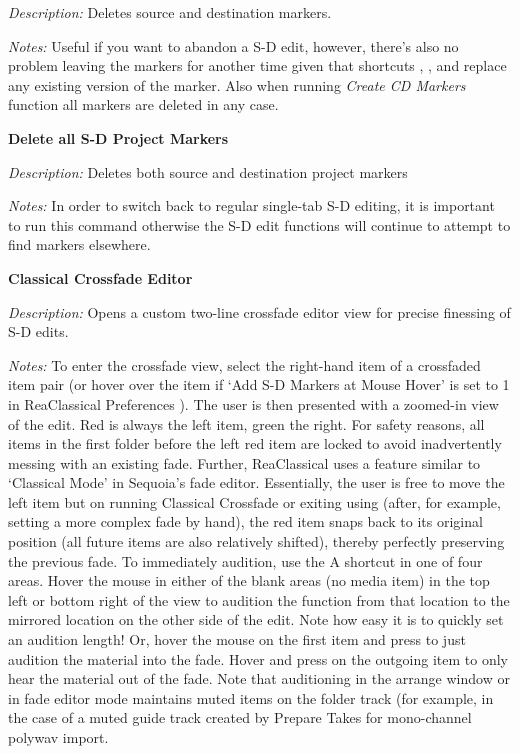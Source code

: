 \documentclass[10pt,american]{article}
\begin{document}
\emph{Description: }Deletes source and destination markers.

\emph{Notes: }Useful if you want to abandon a S-D edit, however, there's also no
problem leaving the markers for another time given that shortcuts 
, , and  replace any existing version of the marker.
Also when running \emph{Create CD Markers} function all markers are deleted in
any case.

\textbf{Delete all S-D Project Markers }\keys{\shift+\del}

\emph{Description:} Deletes both source and destination project markers

\emph{Notes: }In order to switch back to regular single-tab S-D editing, it is
important to run this command otherwise the S-D edit functions will continue to
attempt to find markers elsewhere.

\textbf{Classical Crossfade Editor }

\emph{Description: }Opens a custom two-line crossfade editor view for precise
finessing of S-D edits.

\emph{Notes: }To enter the crossfade view, select the right-hand item of a
crossfaded item pair (or hover over the item if `Add S-D Markers at Mouse Hover'
is set to 1 in ReaClassical Preferences ). The user is then presented
with a zoomed-in view of the edit. Red is always the left item, green the right.
For safety reasons, all items in the first folder before the left red item are
locked to avoid inadvertently messing with an existing fade. Further,
ReaClassical uses a feature similar to `Classical Mode' in Sequoia's fade
editor. Essentially, the user is free to move the left item but on running
Classical Crossfade  or exiting using  (after, for example,
setting a more complex fade by hand), the red item snaps back to its original
position (all future items are also relatively shifted), thereby perfectly
preserving the previous fade. To immediately audition, use the A shortcut in one
of four areas. Hover the mouse in either of the blank areas (no media item) in
the top left or bottom right of the view to audition the function from that
location to the mirrored location on the other side of the edit. Note how easy
it is to quickly set an audition length! Or, hover the mouse on the first item
and press  to just audition the material into the fade. Hover and press
 on the outgoing item to only hear the material out of the fade. Note
that auditioning in the arrange window or in fade editor mode maintains muted
items on the folder track (for example, in the case of a muted guide track
created by Prepare Takes  for mono-channel polywav import.
\end{document}
